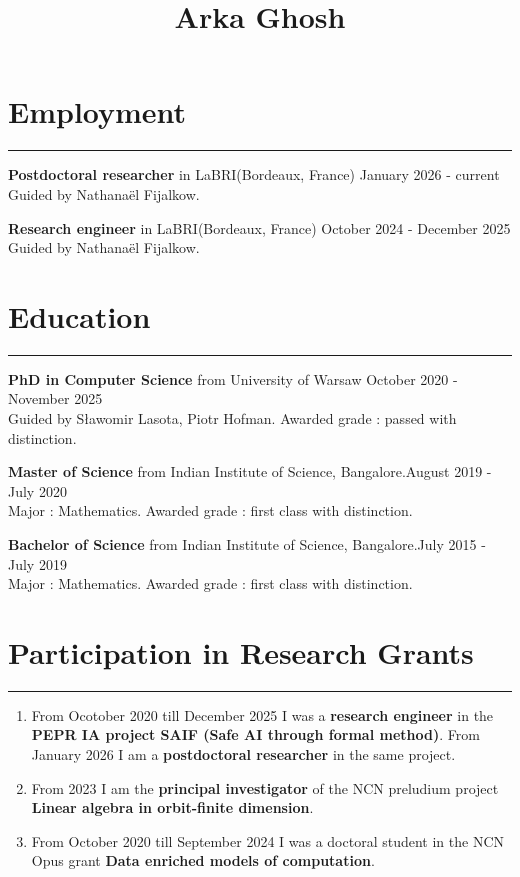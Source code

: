 \documentclass[11pt]{article}
\title{
{\textbf{Arka Ghosh}}
%
%
%
}
\author{}
\date{}
\begin{document}

\maketitle
\vspace{-50pt}
\color{black}
\section*{Employment}
\hrule
\smallskip

\textbf{Postdoctoral researcher} in LaBRI(Bordeaux, France)
\hfill January 2026 - current\\
Guided by Nathana\"{e}l Fijalkow.
\medskip

\textbf{Research engineer} in LaBRI(Bordeaux, France) \hfill October 2024 - December 2025\\
Guided by Nathana\"{e}l Fijalkow.

%
\section*{Education}
\hrule
\medskip
\textbf{PhD in Computer Science} from University of Warsaw
\hfill October 2020 - November 2025\\
Guided by S\l{}awomir Lasota, Piotr Hofman.
Awarded grade : passed with distinction.
\medskip

\textbf{Master of Science} from
Indian Institute of Science, Bangalore.\hfill August 2019 - July 2020\\
Major : Mathematics. Awarded grade : first class with distinction.
\medskip

\textbf{Bachelor of Science} from
Indian Institute of Science, Bangalore.\hfill July 2015 - July 2019\\
Major : Mathematics. Awarded grade : first class with distinction.
%
\section*{Participation in Research Grants}
\hrule
\smallskip
\begin{enumerate}
\item[$\diamond$]
From Ocotober 2020 till December 2025 I was a \textbf{research engineer} in the \textbf{PEPR IA project SAIF (Safe AI through formal method)}.
From January 2026 I am a \textbf{postdoctoral researcher} in the same project.
\item[$\diamond$]
From 2023 I am the \textbf{principal investigator} of the NCN preludium project
\textbf{Linear algebra in orbit-finite dimension}.
\item[$\diamond$]
From October 2020 till September 2024 I was a doctoral student in the NCN Opus grant \textbf{Data enriched models of computation}.
\end{enumerate}
%
\end{document}
